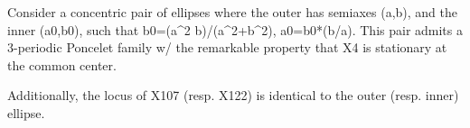 Consider a concentric pair of ellipses where the outer has semiaxes (a,b), and the inner (a0,b0), such that b0=(a^2 b)/(a^2+b^2), a0=b0*(b/a). This pair admits a 3-periodic Poncelet family w/ the remarkable property that X4 is stationary at the common center. 

Additionally, the locus of X107 (resp. X122) is identical to the outer (resp. inner) ellipse.